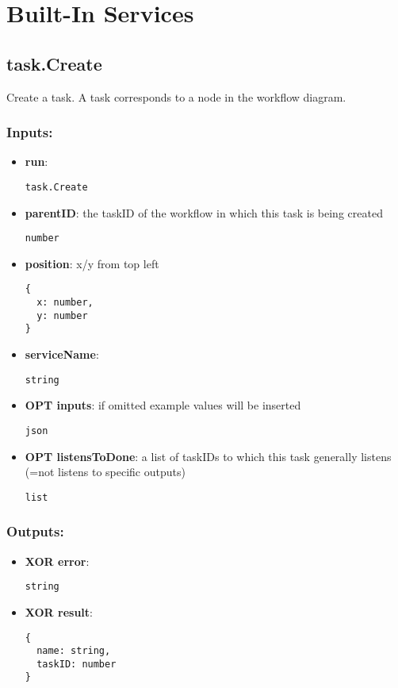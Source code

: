 \section{Built-In Services}
\label{ch:builtinservices}

\subsection{task.Create}
\label{ch:builtinservices:task.Create}
Create a task. A task corresponds to a node in the workflow diagram.
\subsubsection*{Inputs:}
\begin{itemize}
    \item \textbf{run}: 
\begin{lstlisting}
task.Create
\end{lstlisting}
    \item \textbf{parentID}: the taskID of the workflow in which this task is being created
\begin{lstlisting}
number
\end{lstlisting}
    \item \textbf{position}: x/y from top left
\begin{lstlisting}
{
  x: number, 
  y: number
}
\end{lstlisting}
    \item \textbf{serviceName}: 
\begin{lstlisting}
string
\end{lstlisting}
    \item \textbf{OPT inputs}: if omitted example values will be inserted
\begin{lstlisting}
json
\end{lstlisting}
    \item \textbf{OPT listensToDone}: a list of taskIDs to which this task generally listens (=not listens to specific outputs)
\begin{lstlisting}
list
\end{lstlisting}
  \end{itemize}

\subsubsection*{Outputs:}
\begin{itemize}
    \item \textbf{XOR error}: 
\begin{lstlisting}
string
\end{lstlisting}
    \item \textbf{XOR result}: 
\begin{lstlisting}
{
  name: string, 
  taskID: number
}
\end{lstlisting}
  \end{itemize}

